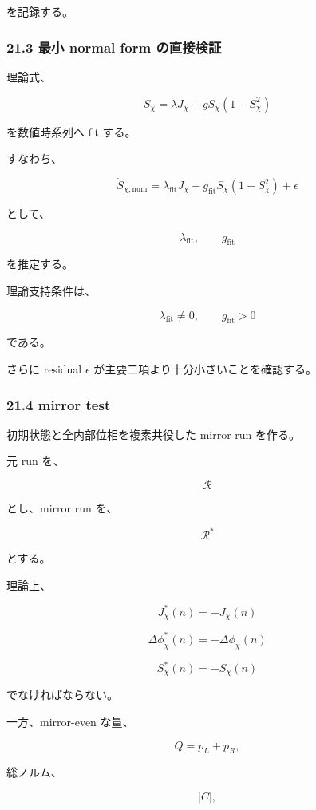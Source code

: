 \documentclass[
  a4paper,
]{ltjsarticle}
\begin{document}
を記録する。

\subsubsection{21.3 最小 normal form
の直接検証}\label{ux6700ux5c0f-normal-form-ux306eux76f4ux63a5ux691cux8a3c}

理論式、

\[
\dot S_\chi
=
\lambda J_\chi
+
gS_\chi(1-S_\chi^2)
\]

を数値時系列へ fit する。

すなわち、

\[
\boxed{
\dot S_{\chi,\mathrm{num}}
=
\lambda_{\mathrm{fit}}J_\chi
+
g_{\mathrm{fit}}
S_\chi(1-S_\chi^2)
+
\epsilon
}
\tag{180}
\]

として、

\[
\lambda_{\mathrm{fit}},
\qquad
g_{\mathrm{fit}}
\]

を推定する。

理論支持条件は、

\[
\boxed{
\lambda_{\mathrm{fit}}\neq0,
\qquad
g_{\mathrm{fit}}>0
}
\tag{181}
\]

である。

さらに residual \(\epsilon\) が主要二項より十分小さいことを確認する。

\subsubsection{21.4 mirror test}\label{mirror-test}

初期状態と全内部位相を複素共役した mirror run を作る。

元 run を、

\[
\mathcal R
\]

とし、mirror run を、

\[
\mathcal R^*
\]

とする。

理論上、

\[
\boxed{
J_\chi^{*}(n)
=
-J_\chi(n)
}
\tag{182}
\]

\[
\boxed{
\Delta\phi_\chi^{*}(n)
=
-\Delta\phi_\chi(n)
}
\tag{183}
\]

\[
\boxed{
S_\chi^{*}(n)
=
-S_\chi(n)
}
\tag{184}
\]

でなければならない。

一方、mirror-even な量、

\[
Q=p_L+p_R,
\]

総ノルム、

\[
|C|,
\]
\end{document}
